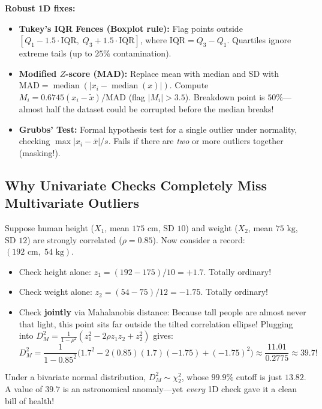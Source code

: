 \documentclass[11pt, a4paper]{article}
\begin{document}
\textbf{Robust 1D fixes:}
\begin{itemize}
    \item \textbf{Tukey's IQR Fences (Boxplot rule):} Flag points outside $[Q_1 - 1.5\cdot\text{IQR},\; Q_3 + 1.5\cdot\text{IQR}]$, where $\text{IQR} = Q_3 - Q_1$. Quartiles ignore extreme tails (up to $25\%$ contamination).
    \item \textbf{Modified $Z$-score (MAD):} Replace mean with median and SD with $\text{MAD} = \operatorname{median}(|x_i - \operatorname{median}(x)|)$. Compute $M_i = 0.6745(x_i - \tilde{x})/\text{MAD}$ (flag $|M_i| > 3.5$). Breakdown point is $50\%$---almost half the dataset could be corrupted before the median breaks!
    \item \textbf{Grubbs' Test:} Formal hypothesis test for a single outlier under normality, checking $\max |x_i - \bar{x}| / s$. Fails if there are \emph{two} or more outliers together (masking!).
\end{itemize}

\subsection{Why Univariate Checks Completely Miss Multivariate Outliers}
Suppose human height ($X_1$, mean $175\text{ cm}$, SD $10$) and weight ($X_2$, mean $75\text{ kg}$, SD $12$) are strongly correlated ($\rho = 0.85$). Now consider a record: $(192\text{ cm},\; 54\text{ kg})$.
\begin{itemize}
    \item Check height alone: $z_1 = (192 - 175)/10 = +1.7$. Totally ordinary!
    \item Check weight alone: $z_2 = (54 - 75)/12 = -1.75$. Totally ordinary!
    \item Check \textbf{jointly} via Mahalanobis distance: Because tall people are almost never that light, this point sits far outside the tilted correlation ellipse! Plugging into $D_M^2 = \frac{1}{1-\rho^2}(z_1^2 - 2\rho z_1 z_2 + z_2^2)$ gives:
    \[
        D_M^2 = \frac{1}{1 - 0.85^2}\big(1.7^2 - 2(0.85)(1.7)(-1.75) + (-1.75)^2\big) \approx \frac{11.01}{0.2775} \approx 39.7!
    \]
\end{itemize}
Under a bivariate normal distribution, $D_M^2 \sim \chi_2^2$, whose $99.9\%$ cutoff is just $13.82$. A value of $39.7$ is an astronomical anomaly---yet \emph{every} 1D check gave it a clean bill of health!
\end{document}
